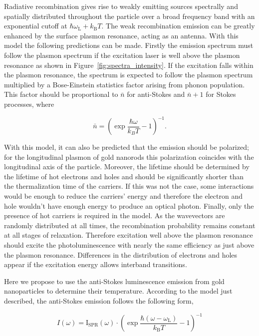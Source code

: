 \documentclass[journal=nalefd,manuscript=letter]{achemso}
\begin{document}
Radiative recombination gives rise to weakly emitting sources spectrally and
spatially distributed throughout the particle over a broad frequency band with
an exponential cutoff at $\hbar\omega_\textrm{L}+k_\textrm{B}T$. The weak
recombination emission can be greatly enhanced by the surface plasmon resonance,
acting as an antenna. With this model the following predictions can be made.
Firstly the emission spectrum must follow the plasmon spectrum if the excitation
laser is well above the plasmon resonance as shown in \mbox{Figure
\ref{fig:spectra_intensity}}. If the excitation falls within the
plasmon resonance, the spectrum is expected to follow the plasmon spectrum
multiplied by a Bose-Einstein statistics factor arising from phonon population.
This factor should be proportional to $\bar{n}$ for anti-Stokes and $\bar{n}+1$
for Stokes processes, where

\begin{equation}\label{eqn:BE}
	\bar{n}=\left(\exp\frac{\hbar\omega}{k_BT}-1\right)^{-1}.
\end{equation}

With this model, it can also be predicted that the emission should be polarized;
for the longitudinal plasmon of gold nanorods this polarization coincides with
the longitudinal axis of the particle\cite{He2015}. Moreover, the lifetime
should be determined by the lifetime of hot electrons and holes and should be
significantly shorter than the thermalization time of the carriers. If this was
not the case, some interactions would be enough to reduce the carriers' energy
and therefore the electron and hole wouldn't have enough energy to produce an
optical photon. Finally, only the presence of hot carriers is required in the
model. As the wavevectors are randomly distributed at all times, the
recombination probability remains constant at all stages of relaxation.
Therefore excitation well above the plasmon resonance should excite the
photoluminescence with nearly the same efficiency as just above the plasmon
resonance\cite{Cheng2015}. Differences in the distribution of electrons and
holes appear if the excitation energy allows interband
transitions\cite{Sundararaman2014,Brown2016}. 

Here we propose to use the anti-Stokes luminescence emission from gold
nanoparticles to determine their temperature. According to the model just
described, the anti-Stokes emission follows the following form,

\begin{equation}\label{eqn:fitting}
	I(\omega) =
	\textrm{I}_{\textrm{SPR}}(\omega)\cdot\left(\exp\frac{\hbar(\omega-\omega_\textrm{L})}{k_\textrm{B}T}-1\right)^{-1}
\end{equation}
\end{document}
